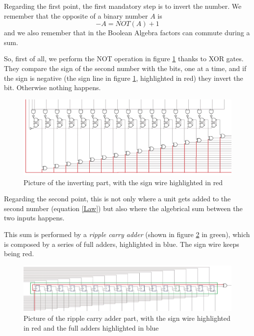 \documentclass{article}
\begin{document}
Regarding the first point, the first mandatory step is to invert the number. We remember that the opposite of a binary number $A$ is
\begin{equation}
-A=NOT(A)+1
\label{Law}
\end{equation}
and we also remember that in the Boolean Algebra factors can commute during a sum.

So, first of all, we perform the NOT operation in figure \ref{Processing1} thanks to XOR gates. They compare the sign of the second number with the bits, one at a time, and if the sign is negative (the sign line in figure \ref{Processing1}, highlighted in red) they invert the bit. Otherwise nothing happens.

\begin{figure}[h]
  \centering
  \includegraphics[scale=0.35]{SC_Processing1.JPG}
  \caption{Picture of the inverting part, with the sign wire highlighted in red}
  \label{Processing1}
\end{figure}

Regarding the second point, this is not only where a unit gets added to the second number (equation \ref{Law}) but also where the algebrical sum between the two inputs happens.

This sum is performed by a \textit{ripple carry adder} (shown in figure \ref{RCA} in green), which is composed by a series of full adders, highlighted in blue. The sign wire keeps being red.

\begin{figure}[h]
  \centering
  \includegraphics[scale=0.43]{SC_Processing2.JPG}
  \caption{Picture of the ripple carry adder part, with the sign wire highlighted in red and the full adders highlighted in blue}
  \label{RCA}
\end{figure}
\end{document}
